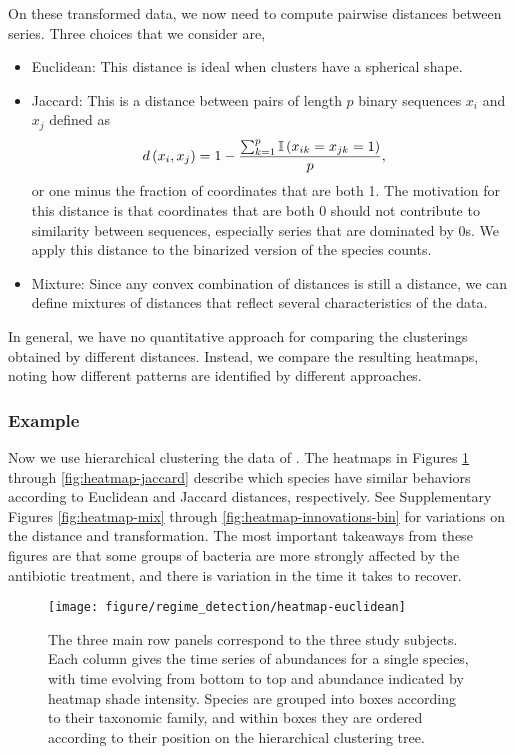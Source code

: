 On these transformed data, we now need to compute pairwise distances between
series. Three choices that we consider are,
\begin{itemize}
\item Euclidean: This distance is ideal when clusters have a spherical shape.
\item Jaccard: This is a distance between pairs of length $p$ binary sequences
  $x_{i}$ and $x_{j}$ defined as
\begin{align*}
  d\left(x_{i}, x_{j}\right) &= 1 - \frac{\sum_{k = 1}^{p} \mathbb{I}\left({x_{ik} = x_{jk} = 1}\right)}{p},
\end{align*}
or one minus the fraction of coordinates that are both 1. The motivation for this
distance is that coordinates that are both 0 should not contribute to similarity
between sequences, especially series that are dominated by 0s. We apply this
distance to the binarized version of the species counts.
\item Mixture: Since any convex combination of distances is still a distance, we
  can define mixtures of distances that reflect several characteristics of the
  data.
\end{itemize}

In general, we have no quantitative approach for comparing the clusterings
obtained by different distances. Instead, we compare the resulting heatmaps,
noting how different patterns are identified by different approaches.

\subsubsection{Example}
\label{sec:hclust_example}

Now we use hierarchical clustering the data of \cite{dethlefsen2011incomplete}.
The heatmaps in Figures \ref{fig:heatmap-euclidean} through
\ref{fig:heatmap-jaccard} describe which species have similar behaviors
according to Euclidean and Jaccard distances, respectively. See Supplementary
Figures \ref{fig:heatmap-mix} through \ref{fig:heatmap-innovations-bin} for
variations on the distance and transformation. The most important takeaways from
these figures are that some groups of bacteria are more strongly affected by the
antibiotic treatment, and there is variation in the time it takes to recover.

\begin{figure}
  \centering
  \texttt{[image: figure/regime\_detection/heatmap-euclidean]}
  \caption{The three main row panels correspond to the three study subjects.
    Each column gives the time series of abundances for a single species, with
    time evolving from bottom to top and abundance indicated by heatmap shade
    intensity. Species are grouped into boxes according to their taxonomic
    family, and within boxes they are ordered according to their position on the
    hierarchical clustering tree.
    \label{fig:heatmap-euclidean} }
\end{figure}

